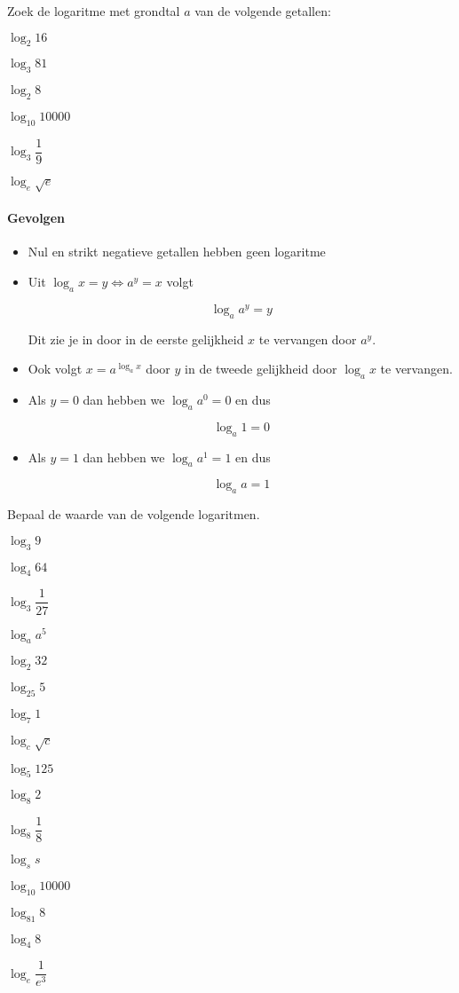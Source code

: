 \documentclass[12pt,twoside,a4paper]{article}
\begin{document}
\begin{oefening}
Zoek de logaritme met grondtal $a$ van de volgende getallen:
\begin{exlist}{2}
  \item $\log_2 16$
  \item $\log_3 81$
  \item $\log_2 8$
  \item $\log_{10} 10000$
  \item $\log_3 \dfrac{1}{9}$
  \item $\log_e \sqrt{e}$
\end{exlist}
\end{oefening}

\paragraph{Gevolgen}
\begin{itemize}
  \item Nul en strikt negatieve getallen hebben geen logaritme
  \item Uit $\log_a x = y \Leftrightarrow a^y=x$ volgt
  \begin{mdframed}
  $$\log_a a^y=y$$
  \end{mdframed}
  Dit zie je in door in de eerste gelijkheid $x$ te vervangen door $a^y$.
  \item Ook volgt $x=a^{\log_a x}$ door $y$ in de tweede gelijkheid door $\log_a x$ te vervangen.
  \item Als $y=0$ dan hebben we $\log_a a^0=0$ en dus
  \begin{mdframed}
  $$\log_a 1=0$$
  \end{mdframed}
  \item Als $y=1$ dan hebben we $\log_a a^1=1$ en dus
  \begin{mdframed}
  $$\log_a a=1$$
  \end{mdframed}
\end{itemize}

\begin{oefening} %
Bepaal de waarde van de volgende logaritmen.
\begin{exlist}{2}
  \item $\log_3 9$
  \item $\log_4 64$
  \item $\log_3 \dfrac{1}{27}$
  \item $\log_a a^5$
  \item $\log_2 32$
  \item $\log_25 5$
  \item $\log_7 1$
  \item $\log_c \sqrt{c}$
  \item $\log_5 125$
  \item $\log_8 2$
  \item $\log_8 \dfrac{1}{8}$
  \item $\log_s s$
  \item $\log_{10} 10000$
  \item $\log_{81} 8$
  \item $\log_4 8$
  \item $\log_e \dfrac{1}{e^3}$
\end{exlist}
\end{oefening}
\end{document}
